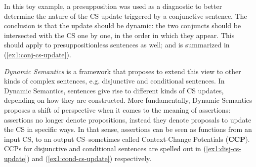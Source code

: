 In this toy example, a presupposition was used as a diagnostic to better determine the nature of the CS update triggered by a conjunctive sentence. The conclusion is that the update should be dynamic: the two conjuncts should be intersected with the CS one by one, in the order in which they appear. This should apply to presuppositionless sentences as well; and is summarized in (\ref{ex1:conj-cs-update}). 


\begin{exe}
	\label{ex1:conj-cs-update}
\end{exe}

\textit{Dynamic Semantics} is a framework that proposes to extend this view to other kinds of complex sentences, e.g. disjunctive and conditional sentences. In Dynamic Semantics, sentences give rise to different kinds of CS updates, depending on how they are constructed. More fundamentally, Dynamic Semantics proposes a shift of perspective when it comes to the meaning of assertions: assertions no longer denote propositions, instead they denote proposals to update the CS in specific ways. In that sense, assertions can be seen as functions from an input CS, to an output CS--sometimes called Context-Change Potentials (\textbf{CCP}). CCPs for disjunctive and conditional sentences are spelled out in (\ref{ex1:disj-cs-update}) and (\ref{ex1:cond-cs-update}) respectively.


